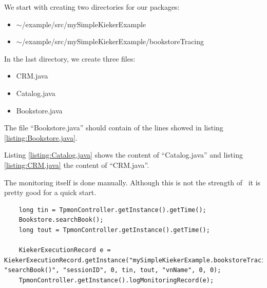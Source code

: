 \documentclass[a4paper, oneside, 11pt]{scrartcl}
\begin{document}
      We start with creating two directories for our packages:
      \begin{itemize}
	\item $\sim$/example/src/mySimpleKiekerExample
	\item $\sim$/example/src/mySimpleKiekerExample/bookstoreTracing
      \end{itemize}
      In the last directory, we create three files: 
      \begin{itemize}
	\item CRM.java
	\item Catalog.java
	\item Bookstore.java
      \end{itemize}
      The file ``Bookstore.java'' should contain of the lines showed in listing \ref{listing:Bookstore.java}.
      \setJavaCodeListing
      \lstset{caption=Bookstore.java, label=listing:Bookstore.java}
      
      Listing \ref{listing:Catalog.java} shows the content of ``Catalog.java'' and listing \ref{listing:CRM.java} the content of ``CRM.java''.
      \lstset{caption=Catalog.java, label=listing:Catalog.java}
      
      \lstset{caption=CRM.java, label=listing:CRM.java}
      
      The monitoring itself is done manually. Although this is not the strength of \Kieker\ it is pretty good for a quick start.
      \lstset{caption=Cutting from Bookstore.java, label=listing:cuttingBookstore}
      \begin{lstlisting}
	long tin = TpmonController.getInstance().getTime();
	Bookstore.searchBook();
	long tout = TpmonController.getInstance().getTime();

	KiekerExecutionRecord e = KiekerExecutionRecord.getInstance("mySimpleKiekerExample.bookstoreTracing.Bookstore", "searchBook()", "sessionID", 0, tin, tout, "vnName", 0, 0);
	TpmonController.getInstance().logMonitoringRecord(e);
      \end{lstlisting}
\end{document}

